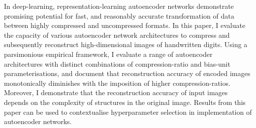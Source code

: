 
\noindent
In deep-learning, representation-learning autoencoder networks demonstrate promising potential for fast, and reasonably accurate transformation of data between highly compressed and uncompressed formats.
In this paper, I evaluate the capacity of various autoencoder network architectures to compress and subsequently reconstruct high-dimensional images of handwritten digits.
Using a parsimonious empirical framework, I evaluate a range of autoencoder architectures with distinct combinations of compression-ratio and bias-unit parameterisations, and document that reconstruction accuracy of encoded images monotonically diminishes with the imposition of higher compression-ratios.
Moreover, I demonstrate that the reconstruction accuracy of input images depends on the complexity of structures in the original image.
Results from this paper can be used to contextualise hyperparameter selection in implementation of autoencoder networks.